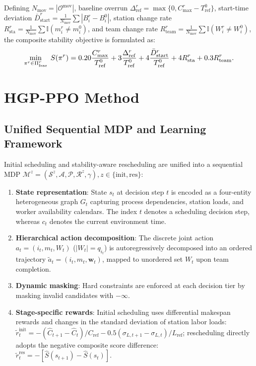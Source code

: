 \documentclass[journal,10pt]{IEEEtran}
\begin{document}
Defining $N_{\mathrm{mov}}=|\mathcal{O}^{\mathrm{mov}}|$, baseline overrun $\Delta_{\mathrm{ref}}^r=\max\{0, C_{\max}^r-T_{\mathrm{ref}}^0\}$, start-time deviation $\bar D_{\mathrm{start}}^r=\frac{1}{N_{\mathrm{mov}}}\sum |B_i^r-B_i^0|$, station change rate $R_{\mathrm{sta}}^r=\frac{1}{N_{\mathrm{mov}}}\sum \mathbb{I}(m_i^r\ne m_i^0)$, and team change rate $R_{\mathrm{team}}^r=\frac{1}{N_{\mathrm{mov}}}\sum \mathbb{I}(W_i^r\ne W_i^0)$, the composite stability objective is formulated as:
\begin{equation}\label{eq:reschedule_obj}
\resizebox{0.88\linewidth}{!}{$\displaystyle
\min_{\pi^r\in\Pi_{\mathrm{feas}}^r}\; S(\pi^r) = 0.20\frac{C_{\max}^r}{T_{\mathrm{ref}}^0} + 3\frac{\Delta_{\mathrm{ref}}^r}{T_{\mathrm{ref}}^0} + 4\frac{\bar D_{\mathrm{start}}^r}{T_{\mathrm{ref}}^0} + 4 R_{\mathrm{sta}}^r + 0.3 R_{\mathrm{team}}^r.
$}
\end{equation}

\section{HGP-PPO Method}\label{sec:method}

\subsection{Unified Sequential MDP and Learning Framework}

Initial scheduling and stability-aware rescheduling are unified into a sequential MDP $\mathcal{M}^z=(\mathcal{S}^z,\mathcal{A},\mathcal{P},\mathcal{R}^z,\gamma), z\in\{\mathrm{init},\mathrm{res}\}$:
\begin{enumerate}
\item \textbf{State representation}: State $s_t$ at decision step $t$ is encoded as a four-entity heterogeneous graph $G_t$ capturing process dependencies, station loads, and worker availability calendars. The index $t$ denotes a scheduling decision step, whereas $c_t$ denotes the current environment time.
\item \textbf{Hierarchical action decomposition}: The discrete joint action $a_t=(i_t,m_t,W_t)$ ($|W_t|=q_{i_t}$) is autoregressively decomposed into an ordered trajectory $\widetilde a_t=(i_t,m_t,\mathbf w_t)$, mapped to unordered set $W_t$ upon team completion.
\item \textbf{Dynamic masking}: Hard constraints are enforced at each decision tier by masking invalid candidates with $-\infty$.
\item \textbf{Stage-specific rewards}: Initial scheduling uses differential makespan rewards and changes in the standard deviation of station labor loads: $\widetilde r_t^{\mathrm{init}} = -(\widehat C_{t+1}-\widehat C_t)/C_{\mathrm{ref}} - 0.5(\sigma_{L,t+1}-\sigma_{L,t})/L_{\mathrm{ref}}$; rescheduling directly adopts the negative composite score difference: $\widetilde r_t^{\mathrm{res}} = -[\widehat S(s_{t+1})-\widehat S(s_t)]$.
\end{enumerate}
\end{document}
